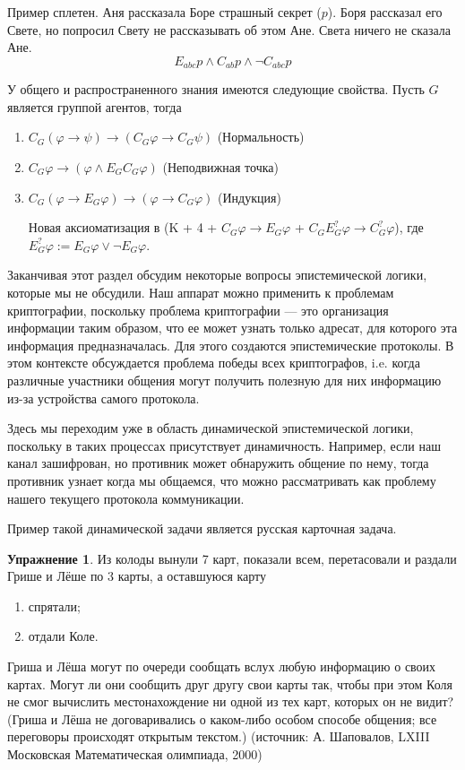\documentclass[openany]{book}
\theoremstyle{plain}
\theoremstyle{definition}
\newtheorem{xrc}{Упражнение}[]
\begin{document}
Пример сплетен. Аня рассказала Боре страшный секрет (\(p\)). Боря рассказал его Свете, но попросил Свету не рассказывать об этом Ане. Света ничего не сказала Ане.
\[E_{abc} p \land C_{ab} p \land \neg C_{abc} p\]

У общего и распространенного знания имеются следующие свойства. Пусть $G$ является группой агентов, тогда
\begin{enumerate}
    \item \(C_G (\varphi \to \psi) \to (C_G \varphi \to C_G \psi)\) (Нормальность)
    \item \(C_G \varphi \to (\varphi \land E_G C_G \varphi)\) (Неподвижная точка)
    \item \(C_G (\varphi \to E_G \varphi) \to (\varphi \to C_G \varphi)\) (Индукция)

	Новая аксиоматизация в \cite{Herzig} (K + 4 + \(C_G \varphi \to E_G \varphi\) + \(C_G E_G^? \varphi \to C_G^? \varphi\)), где \(E_G^? \varphi := E_G \varphi \lor \neg E_G \varphi\).
\end{enumerate}

Заканчивая этот раздел обсудим некоторые вопросы эпистемической логики, которые мы не обсудили. 
Наш аппарат можно применить к проблемам криптографии, поскольку проблема криптографии --- это организация информации таким образом, что ее может узнать только адресат, для которого эта информация предназначалась. Для этого создаются эпистемические протоколы. В этом контексте обсуждается проблема победы всех криптографов, i.e. когда различные участники общения могут получить полезную для них информацию из-за устройства самого протокола.

Здесь мы переходим уже в область динамической эпистемической логики, поскольку в таких процессах присутствует динамичность. Например, если наш канал зашифрован, но противник может обнаружить общение по нему, тогда противник узнает когда мы общаемся, что можно рассматривать как проблему нашего текущего протокола коммуникации.

Пример такой динамической задачи является русская карточная задача.
\begin{xrc}
    Из колоды вынули 7 карт, показали всем, перетасовали и раздали Грише и Лёше по 3 карты, а оставшуюся карту
    \begin{enumerate}
	\item спрятали;
	\item отдали Коле.
    \end{enumerate}
    Гриша и Лёша могут по очереди сообщать вслух любую информацию о своих картах. Могут ли они сообщить друг другу свои карты так, чтобы при этом Коля не смог вычислить местонахождение ни одной из тех карт, которых он не видит? (Гриша и Лёша не договаривались о каком-либо особом способе общения; все переговоры происходят открытым текстом.) (источник: А. Шаповалов, LXIII Московская Математическая олимпиада, 2000)
\end{xrc}
\end{document}
